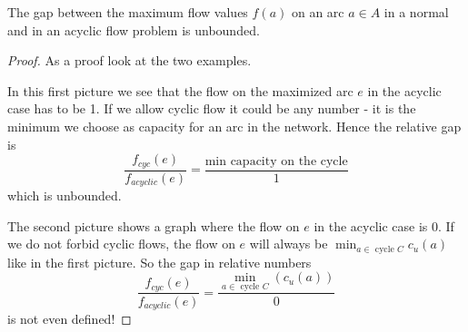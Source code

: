 \begin{prop}
 The gap between the maximum flow values $f(a)$ on an arc $a\in A$ in a normal and in an acyclic flow problem is 
unbounded. 
\end{prop}
\begin{proof}
 As a proof look at the two examples. 
 \begin{figure}[h!]
\centering
{}
 \end{figure}
In this first picture we see that the flow on the maximized arc $e$ in the acyclic case has to be 1. If we allow cyclic 
flow it could be any number - it is the minimum we choose as capacity for an arc in the network. Hence the 
relative gap is
$$ \frac{f_{cyc}(e)}{f_{acyclic}(e)}=\frac{\textrm{min capacity on the cycle}}{1}$$ which is unbounded.
  
\begin{figure}[h!]
\centering
{}
 
\end{figure}

The second picture shows a graph where the flow on $e$ in the acyclic case is $0$. If we do not forbid cyclic flows, 
the flow on $e$ will always be $\min_{a\in \textrm{ cycle }C}c_u(a)$ like in the first picture. So the gap in relative 
numbers $$ \frac{f_{cyc}(e)}{f_{acyclic}(e)}=\frac{\min_{a\in \textrm{ cycle }C}(c_u(a))}{0}$$ is not even defined!
\end{proof}

